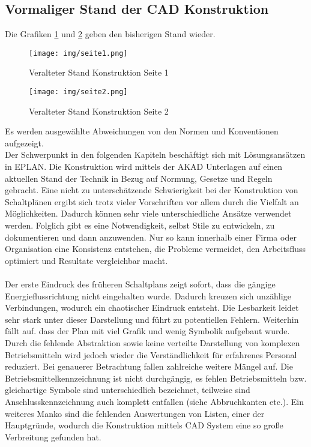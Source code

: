\documentclass[12pt,a4paper]{scrartcl}	%
\begin{document}
\subsection{Vormaliger Stand der CAD Konstruktion}\label{ex}
Die Grafiken \ref{bild1} und \ref{bild2} geben den bisherigen Stand wieder.
\begin{figure}[htb]
	\centering
	\texttt{[image: img/seite1.png]}
	\caption[Veralteter Stand Konstruktion Seite 1]{Veralteter Stand Konstruktion Seite 1}
	\label{bild1}
\end{figure}
\begin{figure}[htb]
	\centering
	\texttt{[image: img/seite2.png]}
	\caption[Veralteter Stand Konstruktion Seite 2]{Veralteter Stand Konstruktion Seite 2}
	\label{bild2}
\end{figure}
Es werden ausgewählte Abweichungen von den Normen und Konventionen aufgezeigt.\\
Der Schwerpunkt in den folgenden Kapiteln beschäftigt sich mit Lösungsansätzen in EPLAN. Die Konstruktion wird mittels der AKAD Unterlagen auf einen aktuellen Stand der Technik in Bezug auf Normung, Gesetze und Regeln gebracht. Eine nicht zu unterschätzende   Schwierigkeit bei der Konstruktion von Schaltplänen ergibt sich trotz vieler Vorschriften vor allem durch die Vielfalt an Möglichkeiten. Dadurch können sehr viele unterschiedliche Ansätze verwendet werden. Folglich gibt es eine Notwendigkeit, selbst Stile zu entwickeln, zu dokumentieren und dann anzuwenden. Nur so kann innerhalb einer Firma oder Organisation eine Konsistenz entstehen, die Probleme vermeidet, den Arbeitsfluss optimiert und Resultate vergleichbar macht.
\\
\\
Der erste Eindruck des früheren Schaltplans zeigt sofort, dass die gängige Energieflussrichtung nicht eingehalten wurde. Dadurch kreuzen sich unzählige Verbindungen, wodurch ein chaotischer Eindruck entsteht. Die Lesbarkeit leidet sehr stark unter dieser Darstellung und führt zu potentiellen Fehlern. Weiterhin fällt auf. dass der Plan mit viel Grafik und wenig Symbolik aufgebaut wurde. Durch die fehlende Abstraktion sowie keine verteilte Darstellung von komplexen Betriebsmitteln wird jedoch wieder die Verständlichkeit für erfahrenes Personal reduziert. Bei genauerer Betrachtung fallen zahlreiche weitere Mängel auf. Die Betriebsmittelkennzeichnung ist nicht durchgängig, es fehlen Betriebsmitteln bzw. gleichartige Symbole sind unterschiedlich bezeichnet, teilweise sind Anschlusskennzeichnung auch komplett entfallen (siehe Abbruchkanten etc.). Ein weiteres Manko sind die fehlenden Auswertungen von Listen, einer der Hauptgründe, wodurch die Konstruktion mittels CAD System eine so große Verbreitung gefunden hat.\\
\end{document}
